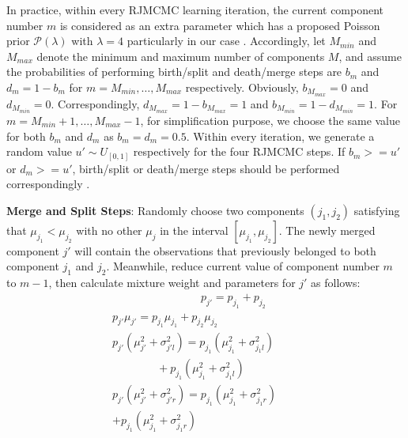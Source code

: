 \documentclass[conference]{IEEEtran}
\begin{document}
In practice, within every RJMCMC learning iteration, the current component number $m$ is considered as an extra parameter which has a proposed Poisson prior $\mathcal{P}(\lambda)$ with $\lambda = 4$ particularly in our case \cite{Richardson1997}. Accordingly, let $M_{min}$ and $M_{max}$ denote the minimum and maximum number of components $M$, and assume the probabilities of performing birth/split and death/merge steps are $b_m$ and $d_m = 1 - b_m$ for $m = M_{min},\dots,M_{max}$ respectively. Obviously, $b_{M_{max}}=0$ and $d_{M_{min}}=0$. Correspondingly, $d_{M_{max}}=1-b_{M_{max}} = 1$ and $b_{M_{min}}=1-d_{M_{min}}=1$. For $m=M_{min}+1,\dots,M_{max}-1$, for simplification purpose, we choose the same value for both $b_m$ and $d_m$ as $b_m=d_m=0.5$. Within every iteration, we generate a random value $u' \sim U_{[0,1]}$ respectively for the four RJMCMC steps. If $b_m >= u'$ or $d_m >= u'$, birth/split or death/merge steps should be performed correspondingly \cite{Richardson1997}.

\textbf{Merge and Split Steps}: Randomly choose two components $(j_1,j_2)$ satisfying that $\mu_{j_1}<\mu_{j_2}$ with no other $\mu_j$ in the interval $[\mu_{j_1},\mu_{j_2}]$. The newly merged component $j'$ will contain the observations that previously belonged to both component $j_1$ and $j_2$. Meanwhile, reduce current value of component number $m$ to $m-1$, then calculate mixture weight and parameters for $j'$ as follows:
\begin{multline}
\qquad\qquad\qquad\qquad p_{j'} = p_{j_1}+p_{j_2} \\
p_{j'}\mu_{j'} = p_{j_1}\mu_{j_1} + p_{j_2}\mu_{j_2} \\
p_{j'}(\mu_{j'}^2 + \sigma_{j'l}^2) = p_{j_1}(\mu_{j_1}^2 + \sigma_{j_1l}^2)\qquad \\
\qquad\qquad+ p_{j_1}(\mu_{j_1}^2 + \sigma_{j_1l}^2) \\
p_{j'}(\mu_{j'}^2 + \sigma_{j'r}^2) = p_{j_1}(\mu_{j_1}^2 + \sigma_{j_1r}^2)\qquad\\
+p_{j_1}(\mu_{j_1}^2 + \sigma_{j_1r}^2)\qquad\qquad
\label{eq:merge}
\end{multline}
\end{document}
